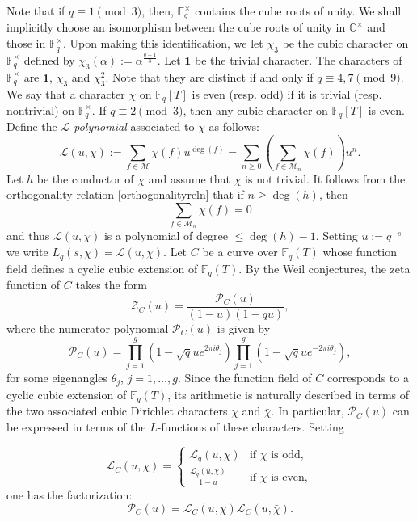 \documentclass[table]{amsart}
\newcommand{\F}{\mathbb{F}}
\newcommand{\cL}{\mathcal{L}}
\newcommand{\cM}{\mathcal{M}}
\newcommand{\op}[1]{\operatorname{#1}}
\numberwithin{equation}{section}
\begin{document}
\par Note that if $q\equiv 1\pmod{3}$, then, $\F_q^\times$ contains the cube roots of unity. We shall implicitly choose an isomorphism between the cube roots of unity in $\mathbb{C}^\times$ and those in $\F_q^\times$. Upon making this identification, we let $\chi_3$ be the cubic character on $\F_q^\times$ defined by $\chi_3(\alpha):=\alpha^{\frac{q-1}{3}}$. Let $\mathbf{1}$ be the trivial character. The characters of $\F_q^\times$ are $\mathbf{1}$, $\chi_3$ and $\chi_3^2$. Note that they are distinct if and only if $q\equiv 4,7\pmod{9}$. We say that a character $\chi$ on $\F_q[T]$ is even (resp. odd) if it is trivial (resp. nontrivial) on $\F_q^\times$. If $q\equiv 2\pmod{3}$, then any cubic character on $\F_q[T]$ is even. Define the \emph{$\mathcal{L}$-polynomial} associated to $\chi$ as follows:
\[\cL(u, \chi):=\sum_{f\in \cM} \chi(f) u^{\op{deg}(f)}=\sum_{n\geq 0} \left(\sum_{f\in \cM_n}\chi(f)\right)u^n.\]
Let $h$ be the conductor of $\chi$ and assume that $\chi$ is not trivial. It follows from the orthogonality relation \eqref{orthogonalityreln} that if $n\geq \op{deg}(h)$, then
\[\sum_{f\in \cM_n} \chi(f)=0\] and thus $\cL(u, \chi)$ is a polynomial of degree $\leq \op{deg}(h)-1$. Setting $u:=q^{-s}$ we write $L_q(s, \chi)=\cL(u, \chi)$. Let \( C \) be a curve over \( \mathbb{F}_q(T) \) whose function field defines a cyclic cubic extension of \( \mathbb{F}_q(T) \). By the Weil conjectures, the zeta function of \( C \) takes the form  
\[
\mathcal{Z}_{C}(u) = \frac{\mathcal{P}_{C}(u)}{(1 - u)(1 - q u)},
\]
\noindent where the numerator polynomial \( \mathcal{P}_{C}(u) \) is given by  
\[
\mathcal{P}_{C}(u) = \prod_{j=1}^{g} \left( 1 - \sqrt{q} u e^{2 \pi i \theta_j} \right) \prod_{j=1}^{g} \left( 1 - \sqrt{q} u e^{-2 \pi i \theta_j} \right),
\]
\noindent for some eigenangles \( \theta_j \), \( j = 1, \dots, g \). Since the function field of \( C \) corresponds to a cyclic cubic extension of \( \mathbb{F}_q(T) \), its arithmetic is naturally described in terms of the two associated cubic Dirichlet characters \( \chi \) and \( \bar{\chi} \). In particular, \( \mathcal{P}_C(u) \) can be expressed in terms of the \( L \)-functions of these characters. Setting

\[
\mathcal{L}_{C}(u, \chi) = 
\begin{cases} 
\mathcal{L}_{q}(u, \chi) & \text{if } \chi \text{ is odd}, \\  
\frac{\mathcal{L}_{q}(u, \chi)}{1 - u} & \text{if } \chi \text{ is even},  
\end{cases}
\]
\noindent one has the factorization:
\[
\mathcal{P}_{C}(u) = \mathcal{L}_{C}(u, \chi) \mathcal{L}_{C}(u, \bar{\chi}).
\]
\end{document}
